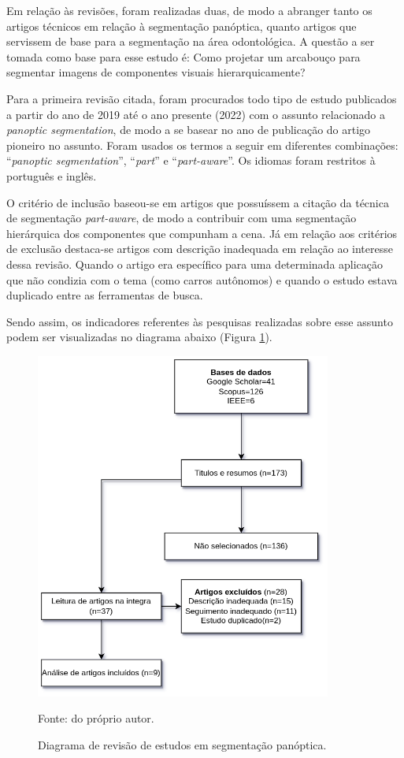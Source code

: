 Em relação às revisões, foram realizadas duas, de modo a abranger tanto os artigos técnicos em relação à segmentação panóptica, quanto artigos que servissem de base para a segmentação na área odontológica. A questão a ser tomada como base para esse estudo é: Como projetar um arcabouço para segmentar imagens de componentes visuais hierarquicamente?

Para a primeira revisão citada, foram procurados todo tipo de estudo publicados a partir do ano de 2019 até o ano presente (2022) com o assunto relacionado a \textit{panoptic segmentation}, de modo a se basear no ano de publicação do artigo pioneiro \cite{Kirillov2019a} no assunto. Foram usados os termos a seguir em diferentes combinações: ``\textit{panoptic segmentation}'', ``\textit{part}'' e ``\textit{part-aware}''. Os idiomas foram restritos à português e inglês.

O critério de inclusão baseou-se em artigos que possuíssem a citação da técnica de segmentação \textit{part-aware}, de modo a contribuir com uma segmentação hierárquica dos componentes que compunham a cena. Já em relação aos critérios de exclusão destaca-se artigos com descrição inadequada em relação ao interesse dessa revisão. Quando o artigo era específico para uma determinada aplicação que não condizia com o tema (como carros autônomos) e quando o estudo estava duplicado entre as ferramentas de busca.

Sendo assim, os indicadores referentes às pesquisas realizadas sobre esse assunto podem ser visualizadas no diagrama abaixo (Figura \ref{proposal:revision:fig:1}).

\begin{figure}[H]
    \centering
    \caption{Diagrama de revisão de estudos em segmentação panóptica.}
    \includegraphics[height=4.5in]{recursos/imagens/proposal/revisao_panoptica.png}
    \label{proposal:revision:fig:1}

    Fonte: do próprio autor.
\end{figure}

